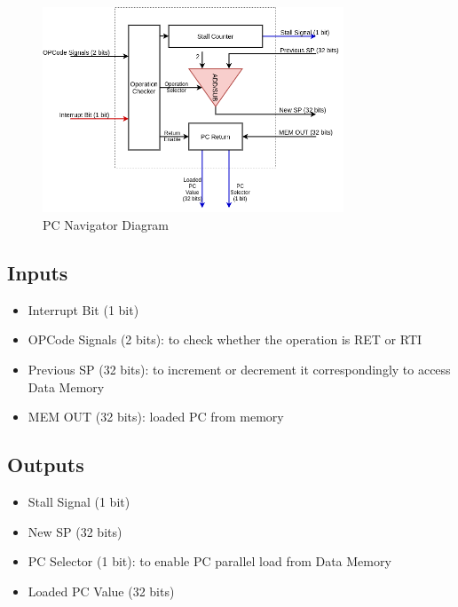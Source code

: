 \begin{figure}[hp]
    \centering
    \includegraphics[width=0.8\textwidth]{images/pc_nav.png}
    \caption{PC Navigator Diagram}
    \label{fig:pc_nav}
\end{figure}

\subsection{Inputs}
\begin{itemize}
    \item Interrupt Bit (1 bit)
    \item OPCode Signals (2 bits): to check whether the operation is RET or RTI
    \item Previous SP (32 bits): to increment or decrement it correspondingly to access Data Memory
    \item MEM OUT (32 bits): loaded PC from memory
\end{itemize}

\subsection{Outputs}
\begin{itemize}
    \item Stall Signal (1 bit)
    \item New SP (32 bits)
    \item PC Selector (1 bit): to enable PC parallel load from Data Memory
    \item Loaded PC Value (32 bits)
\end{itemize}

